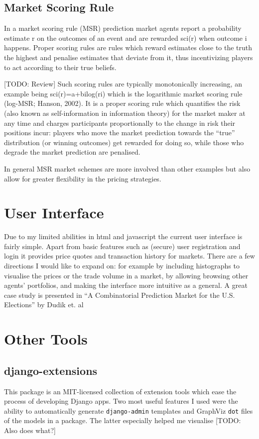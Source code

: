 \documentclass[bsc,frontabs,twoside,singlespacing,parskip,deptreport]{infthesis}     %
\begin{document}
\subsection{Market Scoring Rule}
In a market scoring rule (MSR) prediction market agents report a probability estimate r on the outcomes of an event and are rewarded sci(r) when outcome i happens. Proper scoring rules are rules which reward estimates close to the truth the highest and penalise estimates that deviate from it, thus incentivizing players to act according to their true beliefs.

 [TODO: Review] Such scoring rules are typically monotonically increasing, an example being sci(r)=a+bilog(ri) which is the logarithmic market scoring rule (log-MSR; Hanson, 2002). It is a proper scoring rule which quantifies the risk (also known as self-information in information theory) for the market maker at any time and charges participants proportionally to the change in risk their positions incur: players who move the market prediction towards the “true” distribution (or winning outcomes) get rewarded for doing so, while those who degrade the market prediction are penalised.

In general MSR market schemes are more involved than other examples but also allow for greater flexibility in the pricing strategies. 

\section{User Interface}

	Due to my limited abilities in html and javascript the current user interface is fairly simple. Apart from basic features such as (secure) user registration and login it provides price quotes and transaction history for markets. There are a few directions I would like to expand on: for example by including histographs to visualise the prices or the trade volume in a market, by allowing browsing other agents’ portfolios, and making the interface more intuitive as a general. A great case study is presented in “A Combinatorial Prediction Market for the U.S. Elections” by Dudik et. al

\section{Other Tools}

\subsection{django-extensions}
    This package is an MIT-licensed collection of extension tools which ease the process of developing Django apps. Two most useful features I used were the ability to automatically generate {\tt django-admin} templates and GraphViz {\tt dot} files of the models in a package. The latter especially helped me visualise [TODO: Also does what?]
\end{document}
